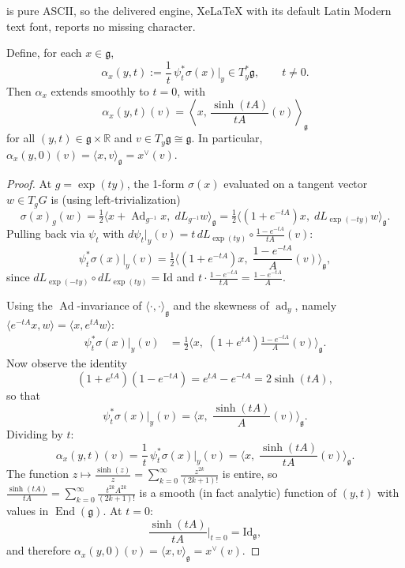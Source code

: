 \documentclass[10pt,a4paper]{amsart}
\newcommand{\Ad}{\operatorname{Ad}}
\newcommand{\R}{\mathbb{R}}
\newcommand{\ad}{\operatorname{ad}}
\newcommand{\g}{\mathfrak{g}}
\begin{document}
is pure ASCII, so the delivered engine, XeLaTeX with its default Latin Modern text font, reports no missing character.
\begin{Lem}\label{lem:cov}
Define, for each $x \in \g$,
\[
\alpha_x(y,t) := \frac{1}{t}\,\psi_t^*\sigma(x)\big|_y \in T_y^*\g, \qquad t \neq 0.
\]
Then $\alpha_x$ extends smoothly to $t = 0$, with
\[
\alpha_x(y,t)(v) = \left\langle x,\, \frac{\sinh(tA)}{tA}(v)\right\rangle_\g
\]
for all $(y,t) \in \g \times \R$ and $v \in T_y\g \cong \g$. In particular, $\alpha_x(y,0)(v) = \langle x, v\rangle_\g = x^\vee(v)$.
\end{Lem}

\begin{proof}
At $g = \exp(ty)$, the 1-form $\sigma(x)$ evaluated on a tangent vector $w \in T_gG$ is (using left-trivialization)
\[
\sigma(x)_g(w) = \tfrac{1}{2}\big\langle x + \Ad_{g^{-1}} x,\; dL_{g^{-1}} w \big\rangle_\g = \tfrac{1}{2}\big\langle (1 + e^{-tA})x,\; dL_{\exp(-ty)} w \big\rangle_\g.
\]
Pulling back via $\psi_t$ with $d\psi_t|_y(v) = t\, dL_{\exp(ty)} \circ \frac{1-e^{-tA}}{tA}(v)$:
\[
\psi_t^*\sigma(x)\big|_y(v) = \tfrac{1}{2}\Big\langle (1 + e^{-tA})x,\;\frac{1-e^{-tA}}{A}(v)\Big\rangle_\g,
\]
since $dL_{\exp(-ty)} \circ dL_{\exp(ty)} = \mathrm{Id}$ and $t \cdot \frac{1-e^{-tA}}{tA} = \frac{1-e^{-tA}}{A}$.
 
Using the $\Ad$-invariance of $\langle\cdot,\cdot\rangle_\g$ and the skewness of $\ad_y$, namely $\langle e^{-tA}x, w\rangle = \langle x, e^{tA}w\rangle$:
\begin{align*}
\psi_t^*\sigma(x)\big|_y(v)
&= \tfrac{1}{2}\Big\langle x,\; (1 + e^{tA})\frac{1-e^{-tA}}{A}(v)\Big\rangle_\g.
\end{align*}
Now observe the identity
\[
(1 + e^{tA})(1 - e^{-tA}) = e^{tA} - e^{-tA} = 2\sinh(tA),
\]
so that
\[
\psi_t^*\sigma(x)\big|_y(v) = \Big\langle x,\;\frac{\sinh(tA)}{A}(v)\Big\rangle_\g.
\]
Dividing by $t$:
\[
\alpha_x(y,t)(v) = \frac{1}{t}\,\psi_t^*\sigma(x)\big|_y(v) = \Big\langle x,\;\frac{\sinh(tA)}{tA}(v)\Big\rangle_\g.
\]
The function $z \mapsto \frac{\sinh(z)}{z} = \sum_{k=0}^\infty \frac{z^{2k}}{(2k+1)!}$ is entire, so $\frac{\sinh(tA)}{tA} = \sum_{k=0}^\infty \frac{t^{2k} A^{2k}}{(2k+1)!}$ is a smooth (in fact analytic) function of $(y,t)$ with values in $\operatorname{End}(\g)$. At $t=0$:
\[
\frac{\sinh(tA)}{tA}\Big|_{t=0} = \mathrm{Id}_\g,
\]
and therefore $\alpha_x(y,0)(v) = \langle x, v\rangle_\g = x^\vee(v)$.
\end{proof}
\end{document}
